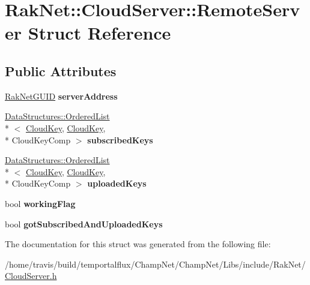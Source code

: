 \hypertarget{struct_rak_net_1_1_cloud_server_1_1_remote_server}{\section{Rak\-Net\-:\-:Cloud\-Server\-:\-:Remote\-Server Struct Reference}
\label{struct_rak_net_1_1_cloud_server_1_1_remote_server}
}
\subsection*{Public Attributes}
\begin{DoxyCompactItemize}
\item 
\hypertarget{struct_rak_net_1_1_cloud_server_1_1_remote_server_a264f54ea3488fac263a75f98fd0e9055}{\hyperlink{struct_rak_net_1_1_rak_net_g_u_i_d}{Rak\-Net\-G\-U\-I\-D} {\bfseries server\-Address}}\label{struct_rak_net_1_1_cloud_server_1_1_remote_server_a264f54ea3488fac263a75f98fd0e9055}

\item 
\hypertarget{struct_rak_net_1_1_cloud_server_1_1_remote_server_a72ffefb7e7eda2e7ef92bd436b03ca45}{\hyperlink{class_data_structures_1_1_ordered_list}{Data\-Structures\-::\-Ordered\-List}\\*
$<$ \hyperlink{struct_rak_net_1_1_cloud_key}{Cloud\-Key}, \hyperlink{struct_rak_net_1_1_cloud_key}{Cloud\-Key}, \\*
Cloud\-Key\-Comp $>$ {\bfseries subscribed\-Keys}}\label{struct_rak_net_1_1_cloud_server_1_1_remote_server_a72ffefb7e7eda2e7ef92bd436b03ca45}

\item 
\hypertarget{struct_rak_net_1_1_cloud_server_1_1_remote_server_a6f950b38728c12e7d1400fd97f067bed}{\hyperlink{class_data_structures_1_1_ordered_list}{Data\-Structures\-::\-Ordered\-List}\\*
$<$ \hyperlink{struct_rak_net_1_1_cloud_key}{Cloud\-Key}, \hyperlink{struct_rak_net_1_1_cloud_key}{Cloud\-Key}, \\*
Cloud\-Key\-Comp $>$ {\bfseries uploaded\-Keys}}\label{struct_rak_net_1_1_cloud_server_1_1_remote_server_a6f950b38728c12e7d1400fd97f067bed}

\item 
\hypertarget{struct_rak_net_1_1_cloud_server_1_1_remote_server_aa149e21838ec9bd69d3b83b4db98c97e}{bool {\bfseries working\-Flag}}\label{struct_rak_net_1_1_cloud_server_1_1_remote_server_aa149e21838ec9bd69d3b83b4db98c97e}

\item 
\hypertarget{struct_rak_net_1_1_cloud_server_1_1_remote_server_a649fb531ae6eee3b17647b041510eed9}{bool {\bfseries got\-Subscribed\-And\-Uploaded\-Keys}}\label{struct_rak_net_1_1_cloud_server_1_1_remote_server_a649fb531ae6eee3b17647b041510eed9}

\end{DoxyCompactItemize}


The documentation for this struct was generated from the following file\-:\begin{DoxyCompactItemize}
\item 
/home/travis/build/temportalflux/\-Champ\-Net/\-Champ\-Net/\-Libs/include/\-Rak\-Net/\hyperlink{_cloud_server_8h}{Cloud\-Server.\-h}\end{DoxyCompactItemize}
